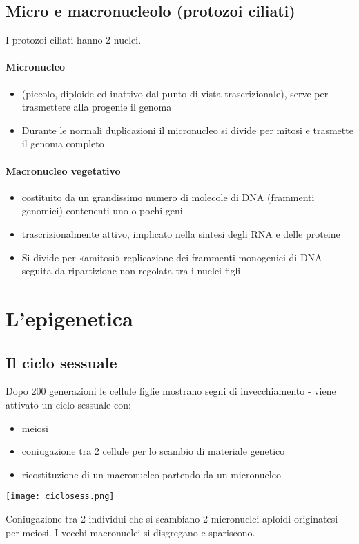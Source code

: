 \documentclass{article}
\begin{document}
\subsection{Micro e macronucleolo (protozoi ciliati)}
I protozoi ciliati hanno 2 nuclei.
\paragraph{Micronucleo}
\begin{itemize}
    \item (piccolo, diploide ed
    inattivo dal punto di vista trascrizionale), serve per
    trasmettere alla progenie il genoma
    \item Durante le normali duplicazioni il
    micronucleo si divide per mitosi e
    trasmette il genoma completo
\end{itemize}
\paragraph{Macronucleo vegetativo}
\begin{itemize}
    \item costituito da un grandissimo numero di molecole di
    DNA (frammenti genomici) contenenti uno o pochi
    geni
    \item trascrizionalmente attivo, implicato nella sintesi degli
    RNA e delle proteine
    \item Si divide per «amitosi» replicazione
    dei frammenti monogenici di DNA
    seguita da ripartizione non regolata
    tra i nuclei figli
\end{itemize}
\section{L'epigenetica}
\subsection{Il ciclo sessuale}
Dopo 200 generazioni le cellule figlie mostrano segni di invecchiamento - viene attivato un ciclo sessuale con:
\begin{itemize}
    \item meiosi
    \item coniugazione tra 2 cellule per lo scambio di materiale genetico
    \item ricostituzione di un macronucleo partendo da un micronucleo
\end{itemize}
\begin{center}
    \texttt{[image: ciclosess.png]}
\end{center}
Coniugazione tra 2 individui che si scambiano 2 micronuclei aploidi originatesi per meiosi.
I vecchi macronuclei si disgregano e spariscono.
\end{document}
